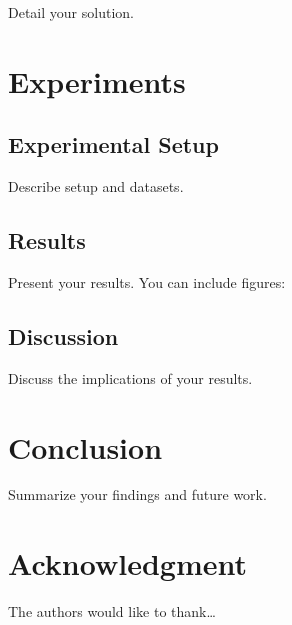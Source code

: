 \documentclass[conference]{IEEEtran}
\begin{document}
Detail your solution.

\section{Experiments}

\subsection{Experimental Setup}

Describe setup and datasets.

\subsection{Results}

Present your results. You can include figures:


\subsection{Discussion}

Discuss the implications of your results.

\section{Conclusion}

Summarize your findings and future work.

\section*{Acknowledgment}

The authors would like to thank\ldots



\end{document}
